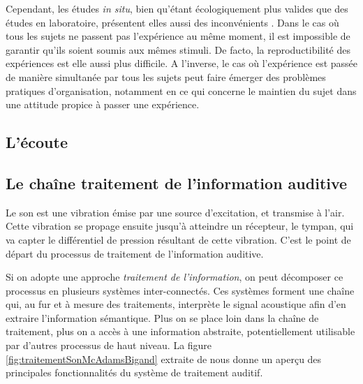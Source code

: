 Cependant, les études \emph{in situ}, bien qu'étant écologiquement plus valides que des études en laboratoire, présentent elles aussi des inconvénients . Dans le cas où tous les sujets ne passent pas l'expérience au même moment, il est impossible de garantir qu'ils soient soumis aux mêmes stimuli. De facto, la reproductibilité des expériences est elle aussi plus difficile. A l'inverse, le cas où l'expérience est passée de manière simultanée par tous les sujets peut faire émerger des problèmes pratiques d'organisation, notamment en ce qui concerne le maintien du sujet dans une attitude propice à passer une expérience.

\subsection{L'écoute}

\subsection{Le chaîne traitement de l'information auditive}
\label{sec:chaineTaite}

Le son est une vibration émise par une source d'excitation, et transmise à l'air. Cette vibration se propage ensuite jusqu'à atteindre un récepteur, le tympan, qui va capter le différentiel de pression résultant de cette vibration. C'est le point de départ du processus de traitement de l'information auditive. 

Si on adopte une approche \emph{traitement de l'information}, on peut décomposer ce processus en plusieurs systèmes inter-connectés. Ces systèmes forment une chaîne qui, au fur et à mesure des traitements, interprète le signal acoustique afin d'en extraire l'information sémantique. Plus on se place loin dans la chaîne de traitement, plus on a accès à une information abstraite, potentiellement utilisable par d'autres processus de haut niveau. La figure \ref{fig:traitementSonMcAdamsBigand} extraite de \citep{mcadams1994penser} nous donne un aperçu des principales fonctionnalités du système de traitement auditif.

